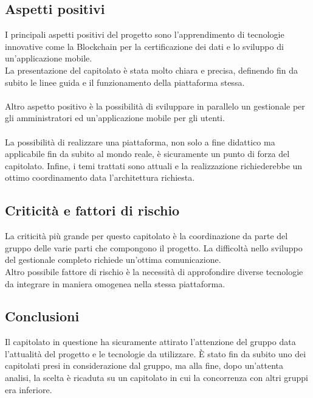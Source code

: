 \subsection{Aspetti positivi}
I principali aspetti positivi del progetto sono l'apprendimento di tecnologie innovative come la Blockchain per la certificazione dei dati e lo sviluppo di un'applicazione mobile.\\
La presentazione del capitolato è stata molto chiara e precisa, definendo fin da subito le linee guida e il funzionamento della piattaforma stessa. \\\\
Altro aspetto positivo è la possibilità di sviluppare in parallelo un gestionale per gli amministratori ed un'applicazione mobile per gli utenti.\\\\
La possibilità di realizzare una piattaforma, non solo a fine didattico ma applicabile fin da subito al mondo reale, è sicuramente un punto di forza del capitolato. Infine, i temi trattati sono attuali e la realizzazione richiederebbe un ottimo coordinamento data l'architettura richiesta.

\subsection{Criticità e fattori di rischio}
La criticità più grande per questo capitolato è la coordinazione da parte del gruppo delle varie parti che compongono il progetto. La difficoltà nello sviluppo del gestionale completo richiede un'ottima comunicazione. \\
Altro possibile fattore di rischio è la necessità di approfondire diverse tecnologie da integrare in maniera omogenea nella stessa piattaforma.

\subsection{Conclusioni}
Il capitolato in questione ha sicuramente attirato l'attenzione del gruppo data l'attualità del progetto e le tecnologie da utilizzare. È stato fin da subito uno dei capitolati presi in considerazione dal gruppo, ma alla fine, dopo un'attenta analisi, la scelta è ricaduta su un capitolato in cui la concorrenza con altri gruppi era inferiore.

\newpage